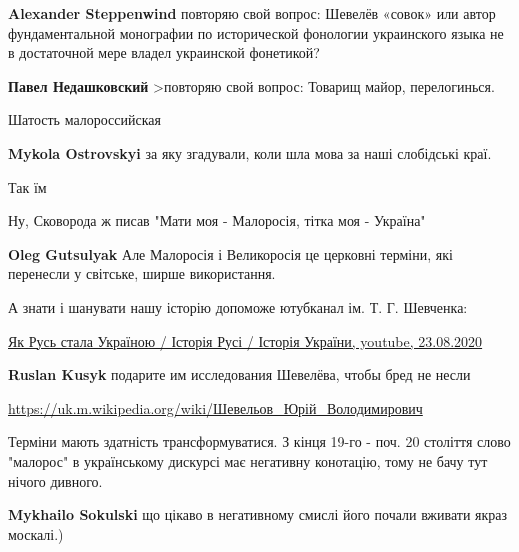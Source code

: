 \begin{itemize}
\begin{itemize}
\textbf{Alexander Steppenwind} повторяю свой вопрос: Шевелёв «совок» или автор фундаментальной монографии по исторической фонологии украинского языка не в достаточной мере владел украинской фонетикой?

\textbf{Павел Недашковский} >повторяю свой вопрос:
Товарищ майор, перелогинься.

\end{itemize} %

Шатость малороссийская

\begin{itemize} %
\textbf{Mykola Ostrovskyi} за яку згадували, коли шла мова за наші слобідські краї.
\end{itemize} %

Так їм

Ну, Сковорода ж писав "Мати моя - Малоросія, тітка моя - Україна"

\begin{itemize} %
\textbf{Oleg Gutsulyak} Але Малоросія і Великоросія це церковні терміни, які перенесли у світське, ширше використання.
\end{itemize} %


А знати і шанувати нашу історію допоможе ютубканал ім. Т. Г. Шевченка:

\href{https://youtu.be/5Zna0WTzFtY}{%
Як Русь стала Україною / Історія Русі / Історія України, youtube, 23.08.2020%
}

\begin{itemize} %
\textbf{Ruslan Kusyk} подарите им исследования Шевелёва, чтобы бред не несли

\url{https://uk.m.wikipedia.org/wiki/Шевельов_Юрій_Володимирович}

\end{itemize} %


Терміни мають здатність трансформуватися. З кінця 19-го - поч. 20 століття
слово "малорос" в українському дискурсі має негативну конотацію, тому не бачу
тут нічого дивного.

\begin{itemize} %
\textbf{Mykhailo Sokulski} що цікаво в негативному смислі його почали вживати якраз москалі.)


\end{itemize}
\end{itemize}
